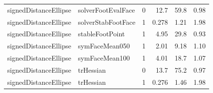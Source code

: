 \begin{tabular}{l l c r r r}
signedDistanceEllipse & solverFootEvalFace & 0 & 12.7 & 59.8 & 0.98 \\
signedDistanceEllipse & solverStabFootFace & 1 & 0.278 & 1.21 & 1.98 \\
signedDistanceEllipse & stableFootPoint & 1 & 4.95 & 29.8 & 0.93 \\
signedDistanceEllipse & symFaceMean050 & 1 & 2.01 & 9.18 & 1.10 \\
signedDistanceEllipse & symFaceMean100 & 1 & 4.01 & 18.7 & 1.07 \\
signedDistanceEllipse & trHessian & 0 & 13.7 & 75.2 & 0.97 \\
signedDistanceEllipse & trHessian & 1 & 0.276 & 1.46 & 1.98 \\
\hline
\end{tabular}
